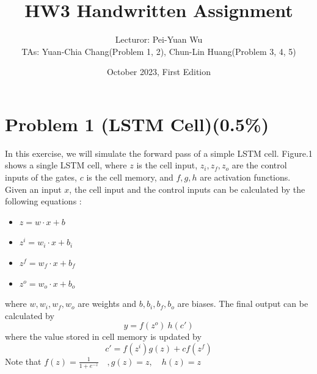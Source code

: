 \documentclass{article}
\title{HW3 Handwritten Assignment}
\author{Lecturor: Pei-Yuan Wu\\
TAs: {Yuan-Chia Chang(Problem 1, 2), Chun-Lin Huang(Problem 3, 4, 5)}}
\date{October 2023, First Edition}
\begin{document}
\maketitle

\section*{Problem 1 (LSTM Cell)(0.5\%)}
In this exercise, we will simulate the forward pass of a simple LSTM cell. Figure.1 shows a single LSTM cell, where $z$ is the cell input, $z_i, z_f, z_o$ are the control inputs of the gates, $c$ is the cell memory, and $f, g, h$ are activation functions. Given an input $x$, the cell input and the control inputs can be calculated by the following equations :
\begin{itemize}
    \item $z = w \cdot x + b$
    \item $z^i = w_i \cdot x + b_i$
    \item $z^f = w_f \cdot x + b_f$
    \item $z^o = w_o \cdot x + b_o$
\end{itemize}
where $w, w_i, w_f, w_o$ are weights and $b, b_i, b_f, b_o$ are biases. The final output can be calculated by
$$y = f(z^o)\ h(c')$$
where the value stored in cell memory is updated by
$$c'=f(z^i)g(z)+cf(z^f)$$
Note that $f(z) = \frac{1}{1+e^{-z}}\quad , g(z) = z,\quad h(z) = z$
\end{document}
